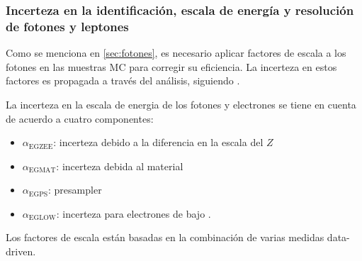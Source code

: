 \subsubsection{Incerteza en la identificación, escala de energía y resolución de fotones y leptones}

Como se menciona en \cref{sec:fotones}, es necesario aplicar factores de escala a los fotones en las
muestras MC para corregir su eficiencia. La incerteza en estos factores es propagada
a través del análisis, siguiendo \cite{PhoEffTwiki}. %

La incerteza en la escala de energia de los fotones y electrones se tiene en cuenta de acuerdo a cuatro componentes\cite{EGScaleTwiki}:

\begin{itemize}\itemsep0.2cm\parskip0.2cm
\item $\alpha_\text{EGZEE}$: incerteza debido a la diferencia en la escala del $Z$
\item $\alpha_\text{EGMAT}$: incerteza debida al material
\item $\alpha_\text{EGPS}$: presampler
\item $\alpha_\text{EGLOW}$: incerteza para electrones de bajo {\pt}.
\end{itemize}


Los factores de escala están basadas en la combinación de varias medidas data-driven.







